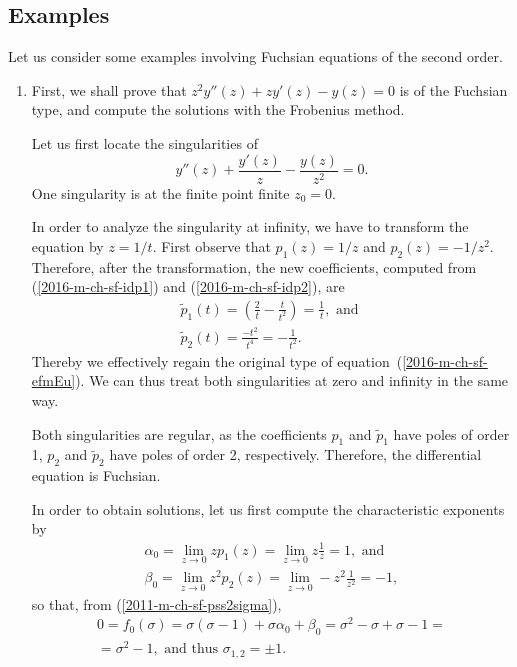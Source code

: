 {
\color{blue}
\bexample

\subsection{Examples}
Let us consider some examples involving Fuchsian equations of the second order.
\begin{enumerate}

\item
First, we shall prove that $z^2 y''(z) + z y'(z) - y(z) = 0$ is of the Fuchsian type, and compute the solutions with the Frobenius method.

Let us first locate the singularities of
\begin{equation}
y''(z) + \frac{y'(z)}{z} - \frac{y(z)}{z^2} = 0.
\label{2016-m-ch-sf-efmEu}
\end{equation}
One singularity is at the finite point finite $z_0=0$.

In order to analyze the singularity at infinity, we have to transform the equation by $z=1/t$.
First observe that
$p_1(z)= 1/z$
and
$p_2(z)= -1/z^2$.
Therefore, after the transformation, the new coefficients, computed from
(\ref{2016-m-ch-sf-idp1}) and (\ref{2016-m-ch-sf-idp2}),
are
\begin{equation}
\begin{split}
\tilde p_1 (t) = \left( \frac{2}{t} - \frac{t}{t^2} \right) =   \frac{1}{t} , \textrm{ and }\\
\tilde p_2 (t) = \frac{- t^2}{t^4}  = -\frac{ 1}{t^2}
.
\end{split}
\end{equation}
Thereby we effectively regain the original type of equation~(\ref{2016-m-ch-sf-efmEu}).
We can thus treat both singularities at zero and infinity in the same way.

Both singularities are regular, as the coefficients
$p_1$ and $\tilde p_1$  have poles of order 1,
$p_2$ and $\tilde p_2$  have poles of order 2, respectively.
Therefore, the differential equation is Fuchsian.

In order to obtain solutions, let us first compute the  characteristic exponents
by
\begin{equation}
\begin{split}
\alpha_0 = \lim_{z \rightarrow 0} z p_1 (z) = \lim_{z \rightarrow 0} z\frac{1}{z} = 1
 , \textrm{ and }\\
\beta_0 = \lim_{z \rightarrow 0} z^2 p_2 (z) = \lim_{z \rightarrow 0} - z^2\frac{1}{z^2} = - 1
,
\end{split}
\end{equation}
so that, from
(\ref{2011-m-ch-sf-pss2sigma}),
\begin{equation}
\begin{split}
0= f_0(\sigma )  = \sigma({\sigma-1}) +  \sigma \alpha_{0} + \beta_{0}           =
\sigma^2 - \sigma +  \sigma  -1 = \\
= \sigma^2   -1
 , \textrm{ and  thus }
\sigma_{1,2} = \pm 1 .
\end{split}
\end{equation}


\end{enumerate}}
